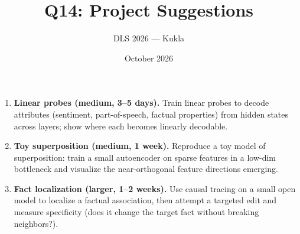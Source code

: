 \documentclass[11pt]{article}
\title{Q14: Project Suggestions}
\author{DLS 2026 --- Kukla}
\date{October 2026}
\begin{document}
\maketitle
\begin{enumerate}[leftmargin=1.5em]
\item \textbf{Linear probes (medium, 3--5 days).} Train linear probes to decode attributes (sentiment, part-of-speech, factual properties) from hidden states across layers; show where each becomes linearly decodable.
\item \textbf{Toy superposition (medium, 1 week).} Reproduce a toy model of superposition: train a small autoencoder on sparse features in a low-dim bottleneck and visualize the near-orthogonal feature directions emerging.
\item \textbf{Fact localization (larger, 1--2 weeks).} Use causal tracing on a small open model to localize a factual association, then attempt a targeted edit and measure specificity (does it change the target fact without breaking neighbors?).
\end{enumerate}
\end{document}
